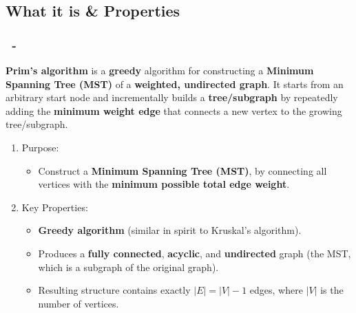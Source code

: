 \documentclass{beamer}
\begin{document}
\subsection{What it is \& Properties}
\begin{frame}
    \frametitle{\insertsection \ - \insertsubsection}
    \textbf{Prim's algorithm} is a \textbf{greedy} algorithm for constructing a \textbf{Minimum Spanning Tree (MST)} of a \textbf{weighted, undirected graph}. It starts from an arbitrary start node and incrementally builds a \textbf{tree/subgraph} by repeatedly adding the \textbf{minimum weight edge} that connects a new vertex to the growing tree/subgraph.
    \vspace{5pt}
    \begin{enumerate}
        \item Purpose:
              \begin{itemize}
                  \item Construct a \textbf{Minimum Spanning Tree (MST)}, by connecting all vertices with the \textbf{minimum possible total edge weight}.
              \end{itemize}
        \item Key Properties:
              \begin{itemize}
                  \item \textbf{Greedy algorithm} (similar in spirit to Kruskal’s algorithm).
                  \item Produces a \textbf{fully connected}, \textbf{acyclic}, and \textbf{undirected} graph (the MST, which is a subgraph of the original graph).
                  \item Resulting structure contains exactly $|E|=|V|-1$ edges, where $|V|$ is the number of vertices.
              \end{itemize}
    \end{enumerate}
\end{frame}
\end{document}
